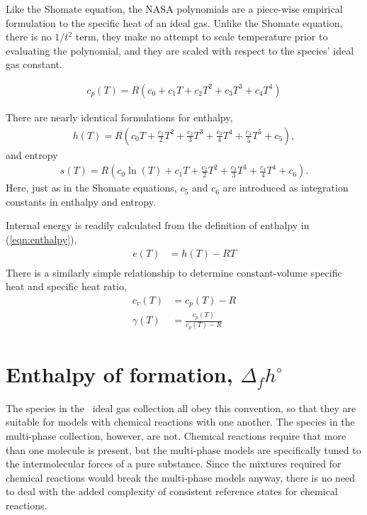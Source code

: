 Like the Shomate equation, the NASA polynomials are a piece-wise empirical formulation to the specific heat of an ideal gas.  Unlike the Shomate equation, there is no $1/t^2$ term, they make no attempt to scale temperature prior to evaluating the polynomial, and they are scaled with respect to the species' ideal gas constant.

\begin{align}
c_p(T) = R\left(c_0 + c_1 T + c_2 T^2 + c_3 T^3 + c_4 T^4\right)
\end{align}

There are nearly identical formulations for enthalpy,
\begin{align}
h(T) = R \left(c_0 T + \frac{c_1}{2} T^2 + \frac{c_2}{3} T^3 + \frac{c_3}{4} T^4 + \frac{c_4}{5}T^5 + c_5 \right),
\end{align}
and entropy
\begin{align}
s(T) = R \left(c_0 \ln(T) + c_1 T + \frac{c_2}{2} T^2 + \frac{c_3}{3} T^3 + \frac{c_4}{4} T^4 + c_6\right).
\end{align}
Here, just as in the Shomate equations, $c_5$ and $c_6$ are introduced as integration constants in enthalpy and entropy.

Internal energy is readily calculated from the definition of enthalpy in (\ref{eqn:enthalpy}),
\begin{align}
e(T) &= h(T) - RT\nonumber\\
\end{align}
There is a similarly simple relationship to determine constant-volume specific heat and specific heat ratio,
\begin{align}
c_v(T) &= c_p(T) - R\\
\gamma(T) &= \frac{c_p(T)}{c_p(T)-R}
\end{align}

\section{Enthalpy of formation, $\Delta_f h^\circ$}

The species in the \PM\ ideal gas collection all obey this convention, so that they are suitable for models with chemical reactions with one another.  The species in the multi-phase collection, however, are not.  Chemical reactions require that more than one molecule is present, but the multi-phase models are specifically tuned to the intermolecular forces of a pure substance.  Since the mixtures required for chemical reactions would break the multi-phase models anyway, there is no need to deal with the added complexity of consistent reference states for chemical reactions.

